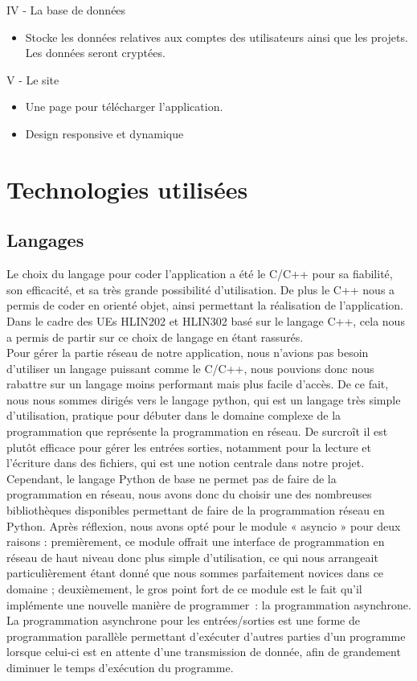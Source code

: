 \documentclass{report}
\begin{document}
IV - La base de données
\begin{itemize}
    \item Stocke les données relatives aux comptes des utilisateurs ainsi que les projets.
Les données seront cryptées.
\end{itemize}
V - Le site
\begin{itemize}
    \item Une page pour télécharger l’application.
    \item Design responsive et dynamique
\end{itemize}

\chapter{Technologies utilisées}
\section{Langages}
Le choix du langage pour coder l'application a été le C/C++ pour sa fiabilité, son efficacité, et sa très grande possibilité d'utilisation. De plus le C++ nous a permis de coder en orienté objet, ainsi permettant la réalisation de l'application.
Dans le cadre des UEs HLIN202 et HLIN302 basé sur le langage C++, cela nous a permis de partir sur ce choix de langage en étant rassurés. \\ %

Pour gérer la partie réseau de notre application, nous n'avions pas besoin d'utiliser un langage puissant comme le C/C++, nous pouvions donc nous rabattre sur un langage moins performant mais plus facile d'accès.
De ce fait, nous nous sommes dirigés vers le langage python, qui est un langage très simple d'utilisation, pratique pour débuter dans le domaine complexe de la programmation que représente la programmation en réseau. De surcroît il est plutôt efficace pour gérer les entrées sorties, notamment pour la lecture et l'écriture dans des fichiers, qui est une notion centrale dans notre projet.\\

Cependant, le langage Python de base ne permet pas de faire de la programmation en réseau, nous avons donc du choisir une des nombreuses bibliothèques disponibles permettant de faire de la programmation réseau en Python. Après réflexion, nous avons opté pour le module « asyncio » pour deux raisons : premièrement, ce module offrait une interface de programmation en réseau de haut niveau donc plus simple d'utilisation, ce qui nous arrangeait particulièrement étant donné que nous sommes parfaitement novices dans ce domaine ; deuxièmement, le gros point fort de ce module est le fait qu'il implémente une nouvelle manière de programmer~: la programmation asynchrone. La programmation asynchrone pour les entrées/sorties est une forme de programmation parallèle permettant d'exécuter d'autres parties d'un programme lorsque celui-ci est en attente d'une transmission de donnée, afin de grandement diminuer le temps d'exécution du programme.
\end{document}
